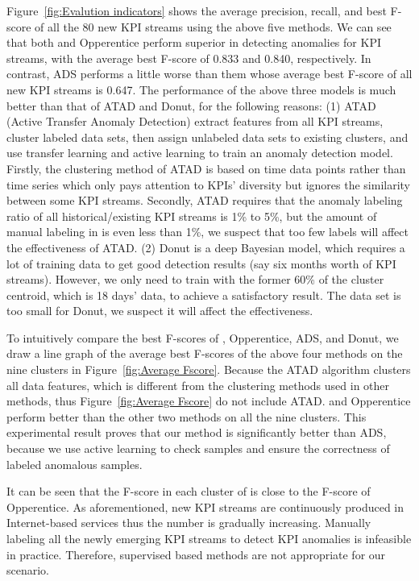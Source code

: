 Figure~\ref{fig:Evalution indicators} shows the average precision, recall, and best F-score of all the 80 new KPI streams using the above five methods. We can see that both \name{} and Opperentice perform superior in detecting anomalies for KPI streams, with the average best F-score of 0.833 and 0.840, respectively. In contrast, ADS performs a little worse than them whose average best F-score of all new KPI streams is 0.647. The performance of the above three models is much better than that of ATAD and Donut, for the following reasons:
(1) ATAD (Active Transfer Anomaly Detection) extract features from all KPI streams, cluster labeled data sets, then assign unlabeled data sets to existing clusters, and use transfer learning and active learning to train an anomaly detection model. Firstly, the clustering method of ATAD is based on time data points rather than time series which only pays attention to KPIs' diversity but ignores the similarity between some KPI streams. Secondly, ATAD requires that the anomaly labeling ratio of all historical/existing KPI streams is 1\% to 5\%, but the amount of manual labeling in \name{} is even less than 1\%, we suspect that too few labels will affect the effectiveness of ATAD.
(2)  Donut is a deep Bayesian model, which requires a lot of training data to get good detection results (say six months worth of KPI streams). However, we only need to train with the former 60\% of the cluster centroid, which is 18 days' data, to achieve a satisfactory result. The data set is too small for Donut, we suspect it will affect the effectiveness.

To intuitively compare the best F-scores of \name{}, Opperentice, ADS, and Donut, we draw a line graph of the average best F-scores of the above four methods on the nine clusters in Figure~\ref{fig:Average Fscore}. Because the ATAD algorithm clusters all data features, which is different from the clustering methods used in other methods, thus Figure~\ref{fig:Average Fscore} do not include ATAD. \name{} and Opperentice perform better than the other two methods on all the nine clusters. This experimental result proves that our method is significantly better than ADS, because we use active learning to check samples and ensure the correctness of labeled anomalous samples.

It can be seen that the F-score in each cluster of \name{} is close to the F-score of Opperentice. As aforementioned, new KPI streams are continuously produced in Internet-based services thus the number is gradually increasing. Manually labeling all the newly emerging KPI streams to detect KPI anomalies is infeasible in practice. Therefore, supervised based methods are not appropriate for our scenario.

